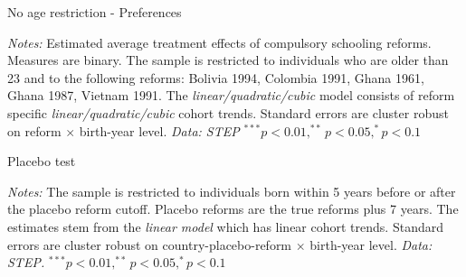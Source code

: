 \begin{table}[htbp]
	\caption{No age restriction - Preferences}
	\label{tab:all_age_prefs}
	\centering
	\begin{threeparttable}
		\footnotesize
		
		\begin{tablenotes}
			\footnotesize
			\item \textit{Notes:} Estimated average treatment effects of compulsory schooling reforms. Measures are binary. The sample is restricted to individuals who are older than 23 and to the following reforms: Bolivia 1994, Colombia 1991, Ghana 1961, Ghana 1987, Vietnam 1991. The \textit{linear/quadratic/cubic} model consists of reform specific \textit{linear/quadratic/cubic} cohort trends. Standard errors are cluster robust on reform $\times$ birth-year level. \textit{Data: STEP} $^{***} p < 0.01, ^{**} p < 0.05, ^{*} p < 0.1$
		\end{tablenotes}
	\end{threeparttable}
\end{table}



\begin{table}[htbp]
	\caption{Placebo test}
	\label{tab:placebo}
	\centering
	\begin{threeparttable}
		
		\begin{tablenotes}
			\footnotesize
			\item \textit{Notes:} The sample is restricted to individuals born within 5 years before or after the placebo reform cutoff. Placebo reforms are the true reforms plus 7 years. The estimates stem from the \textit{linear model} which has linear cohort trends. Standard errors are cluster robust on country-placebo-reform $\times$ birth-year level. \textit{Data: STEP.} $^{***} p < 0.01, ^{**} p < 0.05, ^{*} p < 0.1$
		\end{tablenotes}
	\end{threeparttable}
\end{table}


